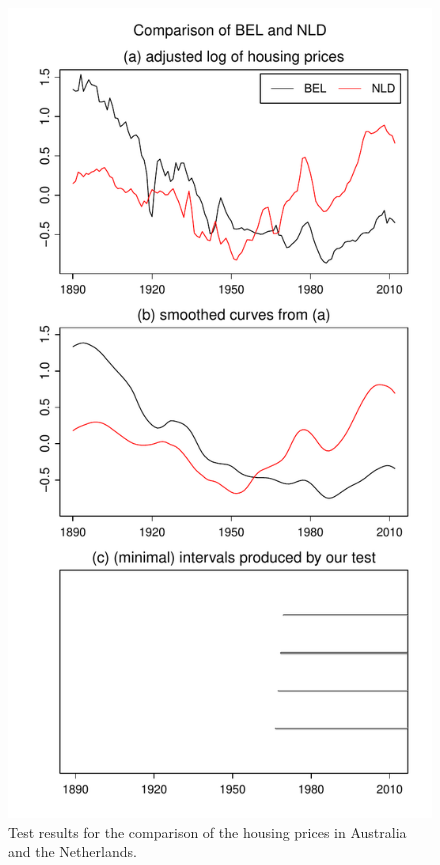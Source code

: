\documentclass[a4paper,12pt]{article}
\begin{document}
\begin{figure}
\begin{minipage}[t]{0.24\textwidth}
\caption{Test results for the comparison of the housing prices in Australia and the Netherlands.}\label{fig:hp:Australia:Netherlands}
\end{minipage}
\hspace{0.1cm}
\begin{minipage}[t]{0.24\textwidth}
\includegraphics[width=\textwidth]{output/plots/hp/BEL_vs_NLD}

\end{minipage}
\end{figure}
\end{document}
